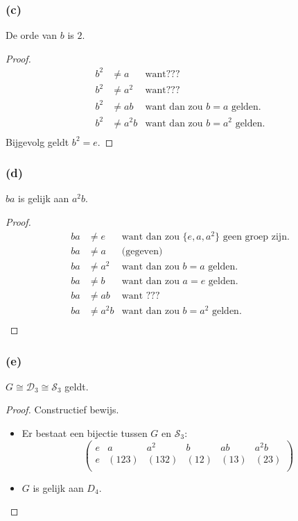 \documentclass[main.tex]{subfiles}
\begin{document}
\subsubsection*{(c)}
De orde van $b$ is $2$.

\begin{proof}
  \[
  \begin{array}{rll}
    b^{2} &\neq a &\text{want} ???\\ 
    b^{2} &\neq a^{2} &\text{want} ??? \\ 
    b^{2} &\neq ab &\text{want dan zou } b=a \text{ gelden.} \\ 
    b^{2} &\neq a^{2}b &\text{want dan zou } b=a^{2} \text{ gelden.} \\ 
  \end{array}
  \]
  Bijgevolg geldt $b^{2} = e$.
\end{proof}


\subsubsection*{(d)}
$ba$ is gelijk aan $a^{2}b$.

\begin{proof}
  \[
  \begin{array}{rll}
    ba &\neq e &\text{want dan zou } \{ e,a,a^{2} \} \text{ geen groep zijn.}\\ 
    ba &\neq a &\text{(gegeven)}\\ 
    ba &\neq a^{2} &\text{want dan zou } b=a \text{ gelden.} \\ 
    ba &\neq b &\text{want dan zou } a=e \text{ gelden.} \\ 
    ba &\neq ab &\text{want ???} \\ 
    ba &\neq a^{2}b &\text{want dan zou } b=a^{2} \text{ gelden.} \\ 
  \end{array}
  \]
\end{proof}

\subsubsection*{(e)}
$G \cong \mathcal{D}_{3} \cong \mathcal{S}_{3}$ geldt.

\begin{proof}
  Constructief bewijs.
  \begin{itemize}
  \item Er bestaat een bijectie tussen $G$ en $\mathcal{S}_{3}$:
    \[
    \begin{pmatrix}
      e & a     & a^{2} & b    & ab   & a^{2}b\\
      e & (123) & (132) & (12) & (13) & (23)\\
    \end{pmatrix}
    \]
  \item $G$ is gelijk aan $D_{4}$.
  \end{itemize}
\end{proof}
\end{document}
